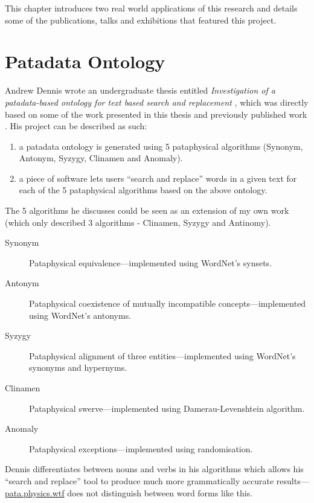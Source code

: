 This chapter introduces two real world applications of this research and details some of the publications, talks and exhibitions that featured this project. 


\section{Patadata Ontology}
\label{s:dennis}

Andrew Dennis wrote an undergraduate thesis entitled \textit{Investigation of a patadata-based ontology for text based search and replacement} \autocite*{Dennis2016}, which was directly based on some of the work presented in this thesis and previously published work \autocite{Raczinski2013,Hugill2013d}. His project can be described as such:

\begin{enumerate}
  \item a patadata ontology is generated using 5 pataphysical algorithms (Synonym, Antonym, Syzygy, Clinamen and Anomaly).
  \item a piece of software lets users ``search and replace'' words in a given text for each of the 5 pataphysical algorithms based on the above ontology.
\end{enumerate}

The 5 algorithms he discusses could be seen as an extension of my own work (which only described 3 algorithms - Clinamen, Syzygy and Antinomy). 

\begin{description}
  \item[Synonym] Pataphysical equivalence---implemented using WordNet's synsets.
  \item[Antonym] Pataphysical coexistence of mutually incompatible concepts---implemented using WordNet's antonyms.
  \item[Syzygy] Pataphysical alignment of three entities---implemented using WordNet's synonyms and hypernyms.
  \item[Clinamen] Pataphysical swerve---implemented using Damerau-Levenshtein algorithm.
  \item[Anomaly] Pataphysical exceptions---implemented using randomisation.
\end{description}

Dennis differentiates between nouns and verbs in his algorithms which allows his ``search and replace'' tool to produce much more grammatically accurate results---\url{pata.physics.wtf} does not distinguish between word forms like this.


